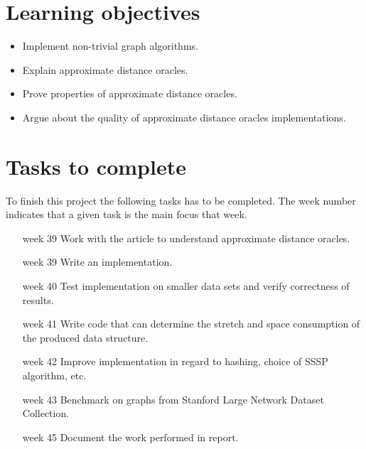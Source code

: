 \documentclass[10pt,a4paper,final,oneside,openany,article]{memoir}
\begin{document}
\chapter{Learning objectives}
\begin{itemize}
    \item Implement non-trivial graph algorithms.
    \item Explain approximate distance oracles.
    \item Prove properties of approximate distance oracles.
    \item Argue about the quality of approximate distance oracles implementations.
\end{itemize}

\chapter{Tasks to complete}
To finish this project the following tasks has to be completed. The week
number indicates that a given task is the main focus that week.

\begin{itemize}[leftmargin=2cm]
    \item[week 39] Work with the article to understand approximate distance
                   oracles.
    \item[week 39] Write an implementation.
    \item[week 40] Test implementation on smaller data sets and verify
                   correctness of results.
    \item[week 41] Write code that can determine the stretch and space
                   consumption of the produced data structure.
    \item[week 42] Improve implementation in regard to hashing, choice of SSSP
                   algorithm, etc.
    \item[week 43] Benchmark on graphs from Stanford Large Network Dataset
                   Collection.
    \item[week 45] Document the work performed in report.
\end{itemize}

\printbibliography
\end{document}
